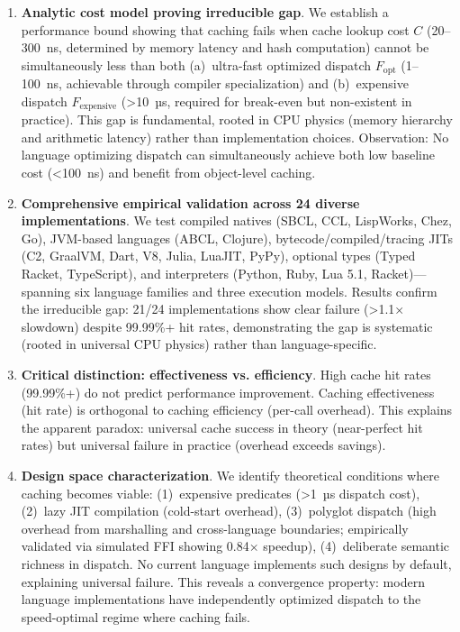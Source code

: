 \documentclass[sigplan,final,acmsmall,review,screen]{acmart}
\begin{document}
\begin{enumerate}
  \item \textbf{Analytic cost model proving irreducible gap}. We establish a performance bound showing that caching fails when
    cache lookup cost $C$ (20--300~ns, determined by memory latency and hash computation) cannot be simultaneously less than both
    (a)~ultra-fast optimized dispatch $F_{\text{opt}}$ (1--100~ns, achievable through compiler specialization) and (b)~expensive dispatch
    $F_{\text{expensive}}$ (>10~µs, required for break-even but non-existent in practice). This gap is fundamental, rooted in CPU physics
    (memory hierarchy and arithmetic latency) rather than implementation choices. Observation: No language optimizing dispatch can simultaneously
    achieve both low baseline cost (<100~ns) and benefit from object-level caching.

  \item \textbf{Comprehensive empirical validation across 24 diverse implementations}. We test compiled natives (SBCL, CCL, LispWorks, Chez, Go),
    JVM-based languages (ABCL, Clojure), bytecode/compiled/tracing JITs (C2, GraalVM, Dart, V8, Julia, LuaJIT, PyPy), optional types (Typed Racket, TypeScript), and interpreters
    (Python, Ruby, Lua 5.1, Racket)—spanning six language families and three execution models. Results confirm the irreducible gap: 21/24 implementations show clear failure
    (>1.1× slowdown) despite 99.99\%+ hit rates, demonstrating the gap is systematic (rooted in universal CPU physics) rather than language-specific.

  \item \textbf{Critical distinction: effectiveness vs. efficiency}. High cache hit rates (99.99\%+) do not predict performance improvement.
    Caching effectiveness (hit rate) is orthogonal to caching efficiency (per-call overhead). This explains the apparent paradox: universal cache success
    in theory (near-perfect hit rates) but universal failure in practice (overhead exceeds savings).

  \item \textbf{Design space characterization}. We identify theoretical conditions where caching becomes viable: (1)~expensive predicates (>1~µs dispatch cost),
    (2)~lazy JIT compilation (cold-start overhead), (3)~polyglot dispatch (high overhead from marshalling and cross-language boundaries; empirically validated via simulated FFI showing 0.84× speedup),
    (4)~deliberate semantic richness in dispatch. No current language implements such designs by default, explaining universal failure. This reveals a convergence property: modern language implementations
    have independently optimized dispatch to the speed-optimal regime where caching fails.


\end{enumerate}
\end{document}
